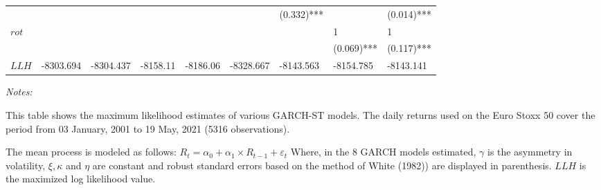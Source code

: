 \documentclass[a4paper, nobind]{templates/ociamthesis}
\begin{document}
\begin{landscape}
\begin{table}
\begin{threeparttable}
{\begin{tabular}[t]{lllllllll}
 &  &  &  &  &  & (0.332)*** &  & (0.014)***\\
$rot$ &  &  &  &  &  &  & 1 & 1\\
 &  &  &  &  &  &  & (0.069)*** & (0.117)***\\
\addlinespace
$LLH$ & -8303.694 & -8304.437 & -8158.11 & -8186.06 & -8328.667 & -8143.563 & -8154.785 & -8143.141\\
\bottomrule
\end{tabular}}
\begin{tablenotes}
\item \textit{Notes:} 
\item This table shows the maximum likelihood estimates of various GARCH-ST models. The daily returns used on the Euro Stoxx 50 cover the period from 03 January, 2001 to 19 May, 2021 (5316 observations).
\item The mean process is modeled as follows: $R_t= \alpha_0+ \alpha_1 \times R_{t-1}+ \varepsilon_t$ Where, in the 8 GARCH models estimated, $\gamma$ is the asymmetry in volatility, $\xi, \kappa$ and $\eta$ are constant and robust standard errors based on the method of White (1982)) are displayed in parenthesis. $LLH$ is the maximized log likelihood value.
\end{tablenotes}
\end{threeparttable}
\end{table}
\end{landscape}

\clearpage
\newpage
\end{document}
